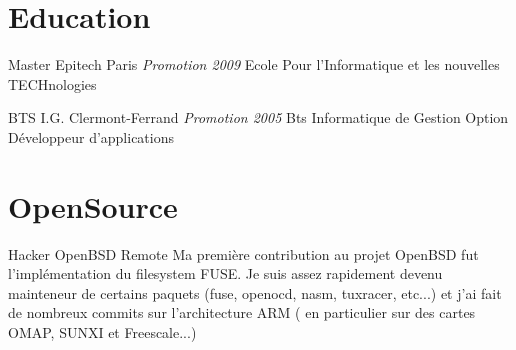 \documentclass[11pt,a4paper,sans]{moderncv}
\begin{document}
\section{Education}

{Master}
{Epitech}
{Paris}
{\textit{Promotion 2009}}
{Ecole Pour l'Informatique et les nouvelles TECHnologies}

{BTS}
{I.G.}
{Clermont-Ferrand}
{\textit{Promotion 2005}}
{Bts Informatique de Gestion Option D\'{e}veloppeur d'applications}

\section{OpenSource}

{Hacker}
{OpenBSD}
{Remote}
{}
{
Ma premi\`ere contribution au projet OpenBSD fut l'impl\'ementation du filesystem
FUSE.\newline{}
Je suis assez rapidement devenu mainteneur de certains paquets (fuse, 
openocd, nasm, tuxracer, etc...) et j'ai fait de nombreux commits sur l'architecture
ARM ( en particulier sur des cartes OMAP, SUNXI et Freescale...) 
}
\end{document}
